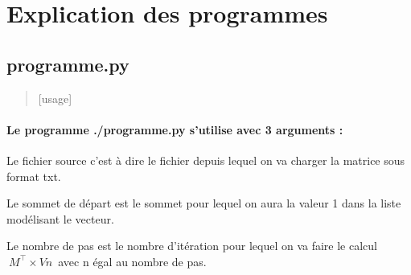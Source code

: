 \documentclass[10pt,a4paper]{article}
\begin{document}
	\section{Explication des programmes}
	\subsection{programme.py}
	\begin{quote}[usage]
	\end{quote}
	\paragraph{
		Le programme ./programme.py s'utilise avec 3 arguments : }
		\begin{description}
			\item  Le fichier source c'est à dire le fichier depuis lequel on va charger la matrice sous format txt.
			\item  Le sommet de d\'epart est le sommet pour lequel on aura la valeur 1 dans la liste mod\'elisant le vecteur.
			\item  Le nombre de pas est le nombre d'it\'eration pour lequel on va faire le calcul $\ M^\top \times Vn $\ avec n \'egal au nombre de pas.
		\end{description}
\end{document}
